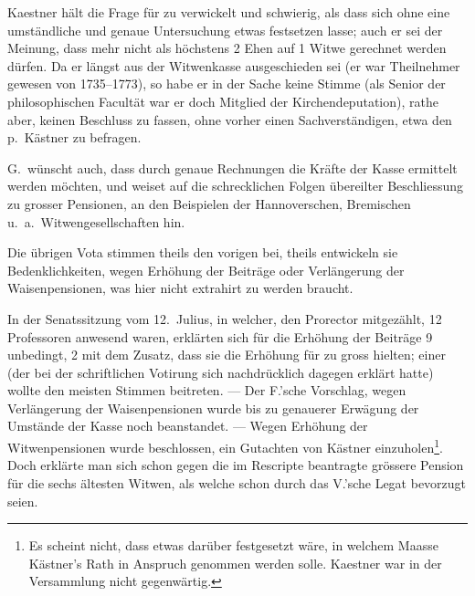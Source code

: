 \documentclass[12pt,a4paper]{article}
\begin{document}
Kaestner h\"alt die Frage f\"ur zu verwickelt und schwierig, als dass sich ohne eine umst\"andliche und genaue Untersuchung etwas festsetzen lasse; auch er sei der Meinung, dass mehr nicht als h\"ochstens 2 Ehen auf 1 Witwe gerechnet werden d\"urfen. Da er l\"angst aus der Witwenkasse ausgeschieden sei (er war Theilnehmer gewesen von 1735--1773), so habe er in der Sache keine Stimme (als Senior der philosophischen Facult\"at war er doch Mitglied der Kirchendeputation), rathe aber, keinen Beschluss zu fassen, ohne vorher einen Sachverst\"andigen, etwa den p.\ K\"astner zu befragen.

G.\ w\"unscht auch, dass durch genaue Rechnungen die Kr\"afte der Kasse ermittelt werden m\"ochten, und weiset auf die schrecklichen Folgen \"ubereilter Beschliessung zu grosser Pensionen, an den Beispielen der Hannoverschen, Bremischen u.\ a.\ Witwengesellschaften hin.

Die \"ubrigen Vota stimmen theils den vorigen bei, theils entwickeln sie Bedenklichkeiten, wegen Erh\"ohung der Beitr\"age oder Verl\"angerung der Waisenpensionen, was hier nicht extrahirt zu werden braucht.

In der Senatssitzung vom 12.\ Julius, in welcher, den Prorector mitgez\"ahlt, 12 Professoren anwesend waren, erkl\"arten sich f\"ur die Erh\"ohung der Beitr\"age 9 unbedingt, 2 mit dem Zusatz, dass sie die Erh\"ohung f\"ur zu gross hielten; einer (der bei der schriftlichen Votirung sich nachdr\"ucklich dagegen erkl\"art hatte) wollte den meisten Stimmen beitreten. --- Der F.'sche Vorschlag, wegen Verl\"angerung der Waisenpensionen wurde bis zu genauerer Erw\"agung der Umst\"ande der Kasse noch beanstandet. --- Wegen Erh\"ohung der Witwenpensionen wurde beschlossen, ein Gutachten von K\"astner einzuholen\footnote{Es scheint nicht, dass etwas dar\"uber festgesetzt w\"are, in welchem Maasse K\"astner's Rath in Anspruch genommen werden solle. Kaestner war in der Versammlung nicht gegenw\"artig.}. Doch erkl\"arte man sich schon gegen die im Rescripte beantragte gr\"ossere Pension f\"ur die sechs \"altesten Witwen, als welche schon durch das V.'sche Legat bevorzugt seien.
\end{document}
